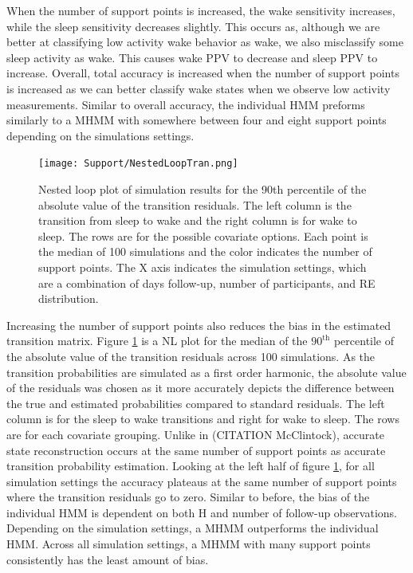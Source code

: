 \documentclass{article}
\begin{document}
When the number of support points is increased, the wake sensitivity increases, while the sleep sensitivity decreases slightly. This occurs as, although we are better at classifying low activity wake behavior as wake, we also misclassify some sleep activity as wake. This causes wake PPV to decrease and sleep PPV to increase. Overall, total accuracy is increased when the number of support points is increased as we can better classify wake states when we observe low activity measurements. Similar to overall accuracy, the individual HMM preforms similarly to a MHMM with somewhere between four and eight support points depending on the simulations settings.

\begin{figure}
    \texttt{[image: Support/NestedLoopTran.png]}
    \centering
    \caption{Nested loop plot of simulation results for 
    the 90th percentile of the absolute value of the transition residuals. The left column is the transition from sleep to wake and the right column is for wake to sleep. The rows are for the possible covariate options. Each point is the median of 100 simulations and the color indicates  the number of support points. The X axis indicates the  simulation settings, which are a combination of days follow-up, number of participants, and RE distribution.}
    \label{NLtran}
\end{figure}

Increasing the number of support points also reduces the bias in the estimated transition matrix. Figure \ref{NLtran} is a NL plot for the median of the $90^{\text{th}}$ percentile of the absolute value of the transition residuals across 100 simulations. As the transition probabilities are simulated as a first order harmonic, the absolute value of the residuals was chosen as it more accurately depicts the difference between the true and estimated probabilities compared to standard residuals. The left column is for the sleep to wake transitions and right for wake to sleep. The rows are for each covariate grouping. Unlike in (CITATION McClintock), accurate state reconstruction occurs at the same number of support points as accurate transition probability estimation. Looking at the left half of figure \ref{NLtran}, for all simulation settings the accuracy plateaus at the same number of support points where the transition residuals go to zero. Similar to before, the bias of the individual HMM is dependent on both H and number of follow-up observations. Depending on the simulation settings, a MHMM outperforms the individual HMM. Across all simulation settings, a MHMM with many support points consistently has the least amount of bias.
\end{document}
